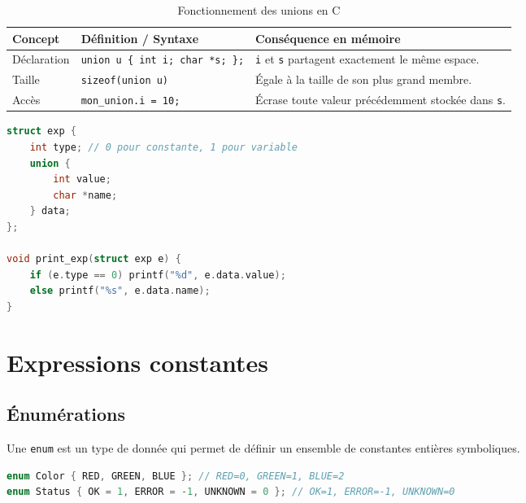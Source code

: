 \documentclass{article}
\begin{document}
\begin{table}[h]
\centering
\begin{tabular}{|l|p{6cm}|p{7cm}|}
\hline
\textbf{Concept} & \textbf{Définition / Syntaxe} & \textbf{Conséquence en mémoire} \\ \hline
Déclaration & \texttt{union u \{ int i; char *s; \};} & \texttt{i} et \texttt{s} partagent exactement le même espace. \\ \hline
Taille & \texttt{sizeof(union u)} & Égale à la taille de son plus grand membre. \\ \hline
Accès & \texttt{mon\_union.i = 10;} & Écrase toute valeur précédemment stockée dans \texttt{s}. \\ \hline
\end{tabular}
\caption{Fonctionnement des unions en C}
\end{table}


\begin{lstlisting}[language=C]
struct exp {
    int type; // 0 pour constante, 1 pour variable
    union {
        int value;
        char *name;
    } data;
};

void print_exp(struct exp e) {
    if (e.type == 0) printf("%d", e.data.value);
    else printf("%s", e.data.name);
}
\end{lstlisting}


\section{Expressions constantes}
\subsection{Énumérations}

Une \texttt{enum} est un type de donnée qui permet de définir un ensemble de constantes entières symboliques.\\
\begin{lstlisting}[language=C]
enum Color { RED, GREEN, BLUE }; // RED=0, GREEN=1, BLUE=2
enum Status { OK = 1, ERROR = -1, UNKNOWN = 0 }; // OK=1, ERROR=-1, UNKNOWN=0
\end{lstlisting}
\end{document}

